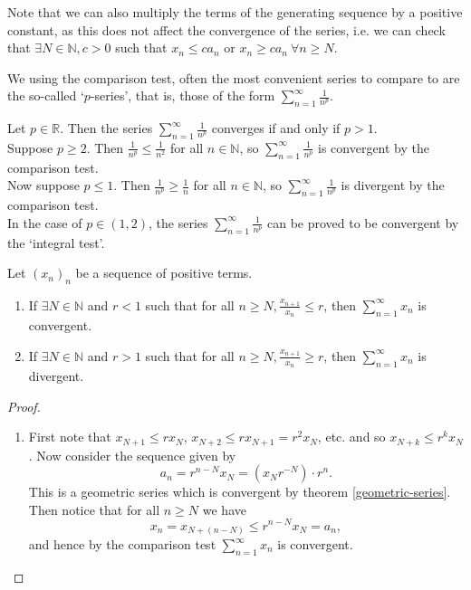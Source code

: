 \documentclass[../real_analysis.tex]{subfiles}
\begin{document}
        Note that we can also multiply the terms of the generating sequence by a positive constant, as this does not affect the convergence of the series, i.e. we can check that $\exists N\in\mathbb{N}, c>0$ such that $x_n\leq ca_n$ or $x_n\geq ca_n\ \forall n\geq N$.

        We using the comparison test, often the most convenient series to compare to are the so-called `$p$-series', that is, those of the form $\sum_{n=1}^\infty\frac{1}{n^p}$.
        \begin{example}
            Let $p\in\mathbb{R}$. Then the series $\sum_{n=1}^\infty\frac{1}{n^p}$ converges if and only if $p>1$.\\
            Suppose $p\geq2$. Then $\frac{1}{n^p}\leq\frac{1}{n^2}$ for all $n\in\mathbb{N}$, so $\sum_{n=1}^\infty\frac{1}{n^p}$ is convergent by the comparison test.\\
            Now suppose $p\leq1$. Then $\frac{1}{n^p}\geq\frac{1}{n}$ for all $n\in\mathbb{N}$, so $\sum_{n=1}^\infty\frac{1}{n^p}$ is divergent by the comparison test.\\
            In the case of $p\in(1, 2)$, the series $\sum_{n=1}^\infty\frac{1}{n^p}$ can be proved to be convergent by the `integral test'.
        \end{example}
        \begin{theorem}
            Let $(x_n)_n$ be a sequence of positive terms.
            \begin{enumerate}[label={\upshape(\roman*)}]
                \item If $\exists N\in\mathbb{N}$ and $r<1$ such that for all $n\geq N, \frac{x_{n+1}}{x_n}\leq r$, then $\sum_{n=1}^\infty x_n$ is convergent.
                \item If $\exists N\in\mathbb{N}$ and $r>1$ such that for all $n\geq N, \frac{x_{n+1}}{x_n}\geq r$, then $\sum_{n=1}^\infty x_n$ is divergent.
                \end{enumerate}
        \end{theorem}
        \begin{proof}\\
            \begin{enumerate}[label={\upshape(\roman*)}]
                \item First note that $x_{N+1}\leq rx_N$, $x_{N+2}\leq rx_{N+1}=r^2x_N$, etc. and so $x_{N+k}\leq r^kx_N$. Now consider the sequence given by
                \begin{equation}
                    a_n=r^{n-N}x_N=(x_Nr^{-N})\cdot r^n.
                \end{equation}
                This is a geometric series which is convergent by theorem \ref{geometric-series}. Then notice that for all $n\geq N$ we have
                \begin{equation}
                    x_n=x_{N+(n-N)}\leq r^{n-N}x_N=a_n,
                \end{equation}
                and hence by the comparison test $\sum_{n=1}^\infty x_n$ is convergent.
            \end{enumerate}
        \end{proof}
\end{document}
